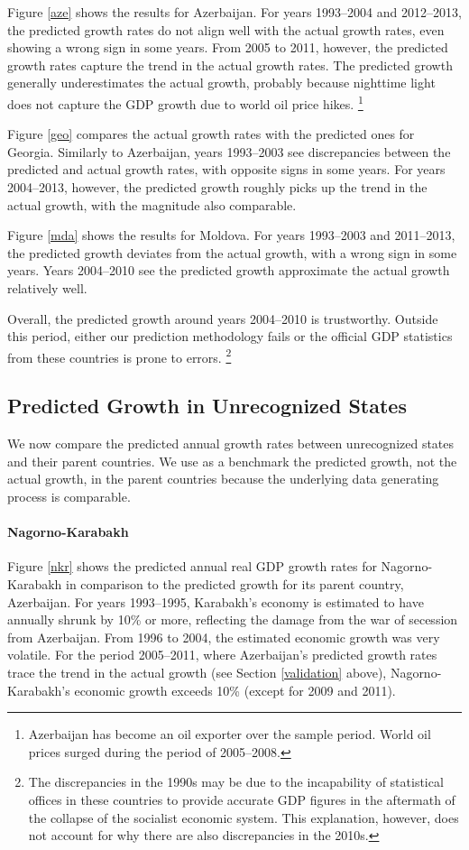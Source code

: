 \documentclass[12pt,a4paper]{article}%
\begin{document}
Figure \ref{aze} shows the results for Azerbaijan.
For years 1993--2004 and 2012--2013, the predicted growth rates do not align well with the actual growth rates, even showing a wrong sign in some years. 
From 2005 to 2011, however, the predicted growth rates capture the trend in the actual growth rates. 
The predicted growth generally underestimates the actual growth, probably because nighttime light does not capture the GDP growth due to world oil price hikes.%
\footnote{
	Azerbaijan has become an oil exporter over the sample period. 	
	World oil prices surged during the period of 2005--2008. 
}

Figure \ref{geo} compares the actual growth rates with the predicted ones for Georgia. 
Similarly to Azerbaijan, years 1993--2003 see discrepancies between the predicted and actual growth rates, with opposite signs in some years. 
For years 2004--2013, however, the predicted growth roughly picks up the trend in the actual growth, with the magnitude also comparable.

Figure \ref{mda} shows the results for Moldova.
For years 1993--2003 and 2011--2013, the predicted growth deviates from the actual growth, with a wrong sign in some years.
Years 2004--2010 see the predicted growth approximate the actual growth relatively well.

Overall, the predicted growth around years 2004--2010 is trustworthy. 
Outside this period, either our prediction methodology fails or the official GDP statistics from these countries is prone to errors.%
\footnote{
	The discrepancies in the 1990s may be due to the incapability of statistical offices in these countries to provide accurate GDP figures in the aftermath of the collapse of the socialist economic system. 
	This explanation, however, does not account for why there are also discrepancies in the 2010s.
}

\subsection{Predicted Growth in Unrecognized States}
We now compare the predicted annual growth rates between unrecognized states and their parent countries. 
We use as a benchmark the predicted growth, not the actual growth, in the parent countries because the underlying data generating process is comparable.

\paragraph{Nagorno-Karabakh}
Figure \ref{nkr} shows the predicted annual real GDP growth rates for Nagorno-Karabakh in comparison to the predicted growth for its parent country, Azerbaijan. 
For years 1993--1995, Karabakh's economy is estimated to have annually shrunk by 10\% or more, reflecting the damage from the war of secession from Azerbaijan. 
From 1996 to 2004, the estimated economic growth was very volatile.
For the period 2005--2011, where Azerbaijan's predicted growth rates trace the trend in the actual growth (see Section \ref{validation} above), Nagorno-Karabakh's economic growth exceeds 10\% (except for 2009 and 2011). 
\end{document}
